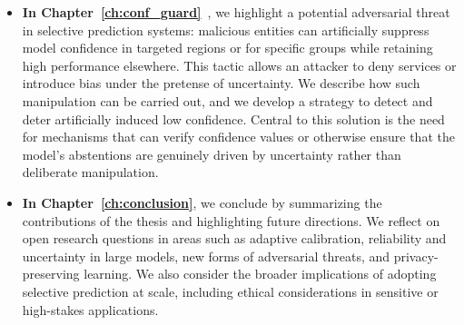 \begin{itemize}
    \item \textbf{In Chapter~\ref{ch:conf_guard}}~\citep{rabanser2025confidential}, we highlight a potential adversarial threat in selective prediction systems: malicious entities can artificially suppress model confidence in targeted regions or for specific groups while retaining high performance elsewhere. This tactic allows an attacker to deny services or introduce bias under the pretense of uncertainty. We describe how such manipulation can be carried out, and we develop a strategy to detect and deter artificially induced low confidence. Central to this solution is the need for mechanisms that can verify confidence values or otherwise ensure that the model's abstentions are genuinely driven by uncertainty rather than deliberate manipulation.


    \item \textbf{In Chapter~\ref{ch:conclusion}}, we conclude by summarizing the contributions of the thesis and highlighting future directions. We reflect on open research questions in areas such as adaptive calibration, reliability and uncertainty in large models, new forms of adversarial threats, and privacy-preserving learning. We also consider the broader implications of adopting selective prediction at scale, including ethical considerations in sensitive or high-stakes applications.
\end{itemize}